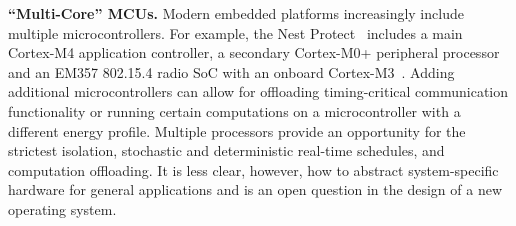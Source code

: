 {\bf ``Multi-Core'' MCUs.}
Modern embedded platforms increasingly include multiple microcontrollers.
For example, the Nest
Protect~\cite{nestprotect} includes a main Cortex-M4 application controller, a secondary
Cortex-M0+ peripheral processor and an EM357 802.15.4 radio SoC with an
onboard Cortex-M3~\cite{nestprotect-teardown}.
Adding additional microcontrollers can allow for offloading timing-critical
communication functionality or running certain computations on a microcontroller
with a different energy profile.
Multiple
processors provide an opportunity for
the strictest isolation, stochastic and deterministic real-time schedules, and
computation offloading. It is less clear, however, how to abstract
system-specific hardware for general applications and is an open question in
the design of a new operating system.







%
%




